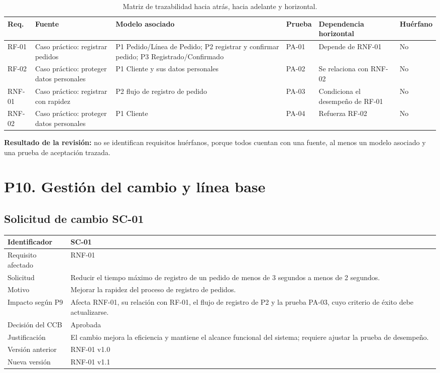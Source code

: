 \documentclass[12pt,a4paper]{article}
\begin{document}
\begin{table}[H]
\centering
\scriptsize
\begin{tabularx}{\textwidth}{|p{1.4cm}|p{2.6cm}|X|p{1.5cm}|p{2.2cm}|p{1.4cm}|}
\hline
\textbf{Req.} & \textbf{Fuente} & \textbf{Modelo asociado} & \textbf{Prueba} & \textbf{Dependencia horizontal} & \textbf{Huérfano} \\
\hline
RF-01 & Caso práctico: registrar pedidos & P1 Pedido/Línea de Pedido; P2 registrar y confirmar pedido; P3 Registrado/Confirmado & PA-01 & Depende de RNF-01 & No \\
\hline
RF-02 & Caso práctico: proteger datos personales & P1 Cliente y sus datos personales & PA-02 & Se relaciona con RNF-02 & No \\
\hline
RNF-01 & Caso práctico: registrar con rapidez & P2 flujo de registro de pedido & PA-03 & Condiciona el desempeño de RF-01 & No \\
\hline
RNF-02 & Caso práctico: proteger datos personales & P1 Cliente & PA-04 & Refuerza RF-02 & No \\
\hline
\end{tabularx}
\caption{Matriz de trazabilidad hacia atrás, hacia adelante y horizontal.}
\end{table}

\textbf{Resultado de la revisión:} no se identifican requisitos huérfanos, porque todos cuentan con una fuente, al menos un modelo asociado y una prueba de aceptación trazada.

\section{P10. Gestión del cambio y línea base}

\subsection*{Solicitud de cambio SC-01}
\begin{tabularx}{\textwidth}{|p{4cm}|X|}\hline
Identificador & SC-01 \\\hline
Requisito afectado & RNF-01 \\\hline
Solicitud & Reducir el tiempo máximo de registro de un pedido de menos de 3 segundos a menos de 2 segundos. \\\hline
Motivo & Mejorar la rapidez del proceso de registro de pedidos. \\\hline
Impacto según P9 & Afecta RNF-01, su relación con RF-01, el flujo de registro de P2 y la prueba PA-03, cuyo criterio de éxito debe actualizarse. \\\hline
Decisión del CCB & Aprobada \\\hline
Justificación & El cambio mejora la eficiencia y mantiene el alcance funcional del sistema; requiere ajustar la prueba de desempeño. \\\hline
Versión anterior & RNF-01 v1.0 \\\hline
Nueva versión & RNF-01 v1.1 \\\hline
\end{tabularx}
\end{document}
